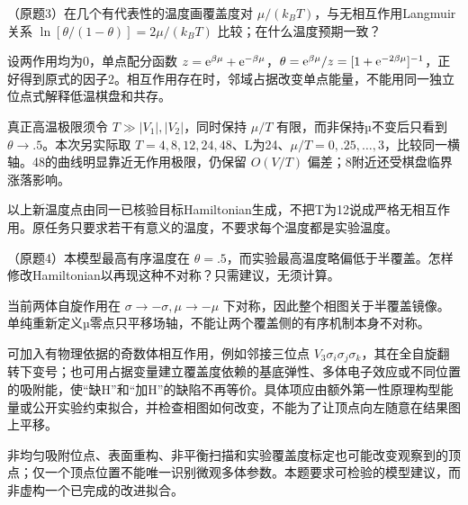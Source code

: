 \begin{exercise}\label{task:lab5-3}
（原题3）在几个有代表性的温度画覆盖度对 $\mu/(k_BT)$，与无相互作用Langmuir关系 $\ln[\theta/(1-\theta)]=2\mu/(k_BT)$ 比较；在什么温度预期一致？
\end{exercise}
\begin{solution}
设两作用均为0，单点配分函数 $z=\mathrm e^{\beta\mu}+\mathrm e^{-\beta\mu}$，$\theta=\mathrm e^{\beta\mu}/z=[1+\mathrm e^{-2\beta\mu}]^{-1}$，正好得到原式的因子2。相互作用存在时，邻域占据改变单点能量，不能用同一独立位点式解释低温棋盘和共存。

真正高温极限须令 $T\gg|V_1|,|V_2|$，同时保持 $\mu/T$ 有限，而非保持µ不变后只看到 $\theta\to.5$。本次另实际取 $T=4,8,12,24,48$、L为24、$\mu/T=0,.25,\ldots,3$，比较同一横轴。48的曲线明显靠近无作用极限，仍保留 $O(V/T)$ 偏差；8附近还受棋盘临界涨落影响。
\begin{center}\end{center}
以上新温度点由同一已核验目标Hamiltonian生成，不把T为12说成严格无相互作用。原任务只要求若干有意义的温度，不要求每个温度都是实验温度。
\end{solution}

\begin{exercise}\label{task:lab5-4}
（原题4）本模型最高有序温度在 $\theta=.5$，而实验最高温度略偏低于半覆盖。怎样修改Hamiltonian以再现这种不对称？只需建议，无须计算。
\end{exercise}
\begin{solution}
当前两体自旋作用在 $\sigma\to-\sigma,\mu\to-\mu$ 下对称，因此整个相图关于半覆盖镜像。单纯重新定义µ零点只平移场轴，不能让两个覆盖侧的有序机制本身不对称。

可加入有物理依据的奇数体相互作用，例如邻接三位点 $V_3\sigma_i\sigma_j\sigma_k$，其在全自旋翻转下变号；也可用占据变量建立覆盖度依赖的基底弹性、多体电子效应或不同位置的吸附能，使“缺H”和“加H”的缺陷不再等价。具体项应由额外第一性原理构型能量或公开实验约束拟合，并检查相图如何改变，不能为了让顶点向左随意在结果图上平移。

非均匀吸附位点、表面重构、非平衡扫描和实验覆盖度标定也可能改变观察到的顶点；仅一个顶点位置不能唯一识别微观多体参数。本题要求可检验的模型建议，而非虚构一个已完成的改进拟合。
\end{solution}

